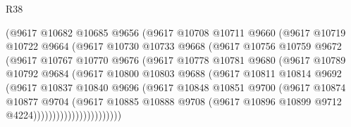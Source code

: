\begin{lexlean}{R38}
\begin{coremodule}
                    (@9617
                      @10682
                      @10685
                      @9656
                      (@9617
                        @10708
                        @10711
                        @9660
                        (@9617
                          @10719
                          @10722
                          @9664
                          (@9617
                            @10730
                            @10733
                            @9668
                            (@9617
                              @10756
                              @10759
                              @9672
                              (@9617
                                @10767
                                @10770
                                @9676
                                (@9617
                                  @10778
                                  @10781
                                  @9680
                                  (@9617
                                    @10789
                                    @10792
                                    @9684
                                    (@9617
                                      @10800
                                      @10803
                                      @9688
                                      (@9617
                                        @10811
                                        @10814
                                        @9692
                                        (@9617
                                          @10837
                                          @10840
                                          @9696
                                          (@9617
                                            @10848
                                            @10851
                                            @9700
                                            (@9617
                                              @10874
                                              @10877
                                              @9704
                                              (@9617
                                                @10885
                                                @10888
                                                @9708
                                                (@9617
                                                  @10896
                                                  @10899
                                                  @9712
                                                  @4224)))))))))))))))))))))))

\end{coremodule}
\end{lexlean}
